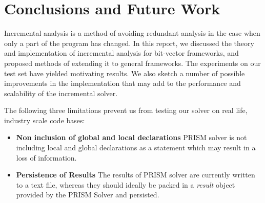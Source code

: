 \documentclass[11pt,a4paper,openright]{report}
\begin{document}
\chapter{Conclusions and Future Work}
%  
% 
% 
Incremental analysis is a method of avoiding redundant analysis in the case when only a part of the program has changed.
In this report, we discussed the theory and implementation of incremental analysis for bit-vector frameworks, and 
proposed methods of extending it to general frameworks. The experiments on our test set have yielded motivating results.
We also sketch a number of possible improvements in the implementation that may add to the performance and scalability of
the incremental solver.


The following three limitations prevent us from testing our solver on real life, industry scale code bases:
\begin{itemize}

 \item \textbf{Non inclusion of global and local declarations} PRISM solver is not including local and global declarations as a statement which may result in
 a loss of information.
 \item \textbf{Persistence of Results} The results of PRISM solver are currently written to a text file, whereas they should 
 ideally be packed in a \emph{result} object provided by the PRISM Solver and persisted.
%  
\end{itemize}
\end{document}
